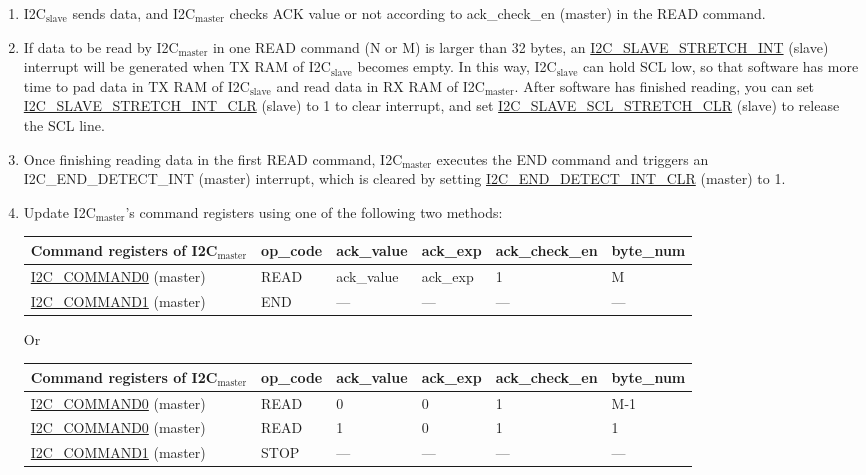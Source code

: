 \documentclass[main\_\_EN.tex]{subfiles}
\begin{document}
\begin{enumerate}
\item I2C$_\text{slave}$ sends data, and I2C$_\text{master}$ checks ACK value or not according to ack\_check\_en (master) in the READ command.
\item If data to be read by I2C$_\text{master}$ in one READ command (N or M) is larger than 32 bytes, an \hyperref[int:i2c-slave-stretch]{I2C\_SLAVE\_STRETCH\_INT} (slave) interrupt will be generated when TX RAM of I2C$_\text{slave}$ becomes empty. In this way, I2C$_\text{slave}$ can hold SCL low, so that software has more time to pad data in TX RAM of I2C$_\text{slave}$ and read data in RX RAM of I2C$_\text{master}$. After software has finished reading, you can set \hyperref[fielddesc:I2CSLAVESTRETCHINTCLR]{I2C\_SLAVE\_STRETCH\_INT\_CLR} (slave) to 1 to clear interrupt, and set \hyperref[fielddesc:I2CSLAVESCLSTRETCHCLR]{I2C\_SLAVE\_SCL\_STRETCH\_CLR} (slave) to release the SCL line.
\item Once finishing reading data in the first READ command, I2C$_\text{master}$ executes the END command and triggers an I2C\_END\_DETECT\_INT (master) interrupt, which is cleared by setting \hyperref[fielddesc:I2CENDDETECTINTCLR]{I2C\_END\_DETECT\_INT\_CLR} (master) to 1.
\item Update I2C$_\text{master}$'s command registers using one of the following two methods:
\begin{longtable}{ | p{4cm} | p{2cm} | p{2cm} | p{2cm} |p{2cm} | p{2cm} |}
\hline\rowcolor{lightgray}
Command registers of I2C$_\text{master}$& op\_code & ack\_value&ack\_exp&ack\_check\_en&byte\_num  \\ \hline
\hyperref[fielddesc:I2CCOMMAND0]{I2C\_COMMAND0} (master)& READ& ack\_value&ack\_exp&1&M  \\ \hline
\hyperref[fielddesc:I2CCOMMAND1]{I2C\_COMMAND1} (master)& END& ---&---&---&---  \\ \hline
\end{longtable}
Or
\begin{longtable}{ | p{4cm} | p{2cm} | p{2cm} | p{2cm} |p{2cm} | p{2cm} |}
\hline\rowcolor{lightgray}
Command registers of I2C$_\text{master}$& op\_code & ack\_value&ack\_exp&ack\_check\_en&byte\_num  \\ \hline
\hyperref[fielddesc:I2CCOMMAND0]{I2C\_COMMAND0} (master)& READ& 0&0&1&M-1  \\ \hline
\hyperref[fielddesc:I2CCOMMAND0]{I2C\_COMMAND0} (master)& READ& 1&0&1&1  \\ \hline
\hyperref[fielddesc:I2CCOMMAND1]{I2C\_COMMAND1} (master)& STOP& ---&---&---&---  \\ \hline
\end{longtable}


\end{enumerate}
\end{document}
